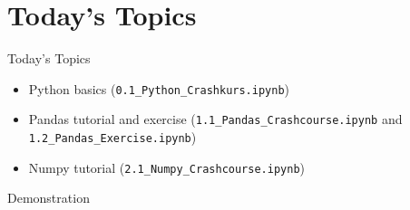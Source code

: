 \documentclass[
                en,
                ]{sdqbeamer}
\begin{document}
\section{Today's Topics}
\begin{frame}{Today's Topics}
    \begin{itemize}
        \setlength\itemsep{2em}
        \item Python basics (\texttt{0.1\_Python\_Crashkurs.ipynb})
        \item Pandas tutorial and exercise
            (\texttt{1.1\_Pandas\_Crashcourse.ipynb} and
            \texttt{1.2\_Pandas\_Exercise.ipynb})
        \item Numpy tutorial (\texttt{2.1\_Numpy\_Crashcourse.ipynb})
    \end{itemize}
\end{frame}

\begin{frame}{Demonstration}
    \vfill
\end{frame}

\appendix
\beginbackup


\backupend
\end{document}
